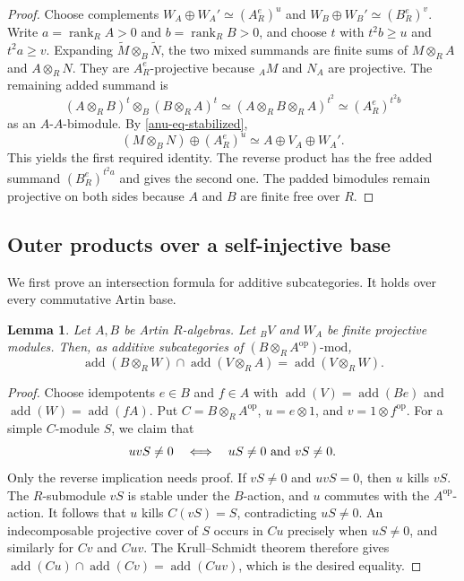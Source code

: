 \documentclass[12pt,a4paper,english,reqno]{amsart}
\numberwithin{equation}{section}
\theoremstyle{plain}
\newtheorem{lemma}[theorem]{Lemma}
\theoremstyle{definition}
\begin{document}
\begin{proof}
Choose complements
$W_A\oplus W_A'\simeq(A_R^e)^u$ and
$W_B\oplus W_B'\simeq(B_R^e)^v$.  Write
$a=\operatorname{rank}_R A>0$ and
$b=\operatorname{rank}_R B>0$, and choose $t$ with
$t^2b\geq u$ and $t^2a\geq v$.
Expanding $\widetilde M\otimes_B\widetilde N$, the two mixed
summands are finite sums of $M\otimes_RA$ and $A\otimes_RN$.
They are $A_R^e$-projective because ${}_AM$ and $N_A$ are projective.
The remaining added summand is
\[
 (A\otimes_RB)^t\otimes_B(B\otimes_RA)^t
 \simeq(A\otimes_RB\otimes_RA)^{t^2}
 \simeq(A_R^e)^{t^2b}
\]
as an $A$-$A$-bimodule.  By \eqref{anu-eq-stabilized},
\[
 (M\otimes_BN)\oplus(A_R^e)^u
 \simeq A\oplus V_A\oplus W_A'.
\]
This yields the first required identity.  The reverse product has
the free added summand $(B_R^e)^{t^2a}$ and gives the second one.
The padded bimodules remain projective on both sides because
$A$ and $B$ are finite free over $R$.
\end{proof}

\subsection{Outer products over a self-injective base}

We first prove an intersection formula for additive subcategories.
It holds over every commutative Artin base.

\begin{lemma}\label{anu-lem-intersection}
Let $A,B$ be Artin $R$-algebras.  Let ${}_BV$ and $W_A$ be finite
projective modules.  Then, as additive subcategories of
$(B\otimes_RA^{\mathrm{op}})\text{-}\mathrm{mod}$,
\[
 \operatorname{add}(B\otimes_RW)
 \cap\operatorname{add}(V\otimes_RA)
 =\operatorname{add}(V\otimes_RW).
\]
\end{lemma}

\begin{proof}
Choose idempotents $e\in B$ and $f\in A$ with
$\operatorname{add}(V)=\operatorname{add}(Be)$ and
$\operatorname{add}(W)=\operatorname{add}(fA)$.  Put
$C=B\otimes_RA^{\mathrm{op}}$, $u=e\otimes1$, and
$v=1\otimes f^{\mathrm{op}}$.
For a simple $C$-module $S$, we claim that
\[
 uvS\ne0\quad\Longleftrightarrow\quad
 uS\ne0\ \hbox{and}\ vS\ne0.
\]
Only the reverse implication needs proof.  If $vS\ne0$ and $uvS=0$,
then $u$ kills $vS$.  The $R$-submodule $vS$ is stable under the $B$-action,
and $u$ commutes with the $A^{\mathrm{op}}$-action.  It follows that
$u$ kills $C(vS)=S$, contradicting $uS\ne0$.
An indecomposable projective cover of $S$ occurs in $Cu$ precisely
when $uS\ne0$, and similarly for $Cv$ and $Cuv$.
The Krull--Schmidt theorem therefore gives
$\operatorname{add}(Cu)\cap\operatorname{add}(Cv)
=\operatorname{add}(Cuv)$, which is the desired equality.
\end{proof}
\end{document}
